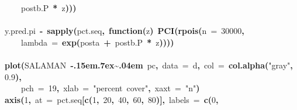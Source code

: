 \documentclass{article}
\makeatletter
\newcommand{\hlnumber}[1]{\textcolor[rgb]{0,0,0}{#1}}%
\newcommand{\hlfunctioncall}[1]{\textcolor[rgb]{.5,0,.33}{\textbf{#1}}}%
\newcommand{\hlstring}[1]{\textcolor[rgb]{.6,.6,1}{#1}}%
\newcommand{\hlkeyword}[1]{\textbf{#1}}%
\newcommand{\hlargument}[1]{\textcolor[rgb]{.69,.25,.02}{#1}}%
\newcommand{\hlformalargs}[1]{\hlargument{#1}}%
\newcommand{\hlassignement}[1]{\textbf{#1}}%
\newcommand{\hlsymbol}[1]{#1}%
\def\urltilda{\kern -.15em\lower .7ex\hbox{\~{}}\kern .04em}%
\newcommand{\hlstd}[1]{\textcolor[rgb]{0,0,0}{#1}}%
\newenvironment{kframe}{%
 \def\FrameCommand##1{\hskip\@totalleftmargin \hskip-\fboxsep
 \colorbox{shadecolor}{##1}\hskip-\fboxsep
     \hskip-\linewidth \hskip-\@totalleftmargin \hskip\columnwidth}%
 \MakeFramed {\advance\hsize-\width
   \@totalleftmargin\z@ \linewidth\hsize
   \@setminipage}}%
 {\par\unskip\endMakeFramed}
\newenvironment{knitrout}{}{} %
\makeatother
\begin{document}
\begin{knitrout}
{\begin{kframe}
\begin{flushleft}
\hlstd{}{\ }{\ }{\ }{\ }\hlsymbol{post}\hlkeyword{\usebox{\hlnormalsizeboxdollar}}\hlsymbol{b.P}{\ }\hlkeyword{*}{\ }\hlsymbol{z}\hlkeyword{)}\hlkeyword{)}\hlkeyword{)}\hspace*{\fill}\\
\hlstd{}\hspace*{\fill}\\
\hlstd{}\hlsymbol{y.pred.pi}{\ }\hlassignement{\usebox{\hlnormalsizeboxlessthan}-}{\ }\hlfunctioncall{sapply}\hlkeyword{(}\hlsymbol{pct.seq}\hlkeyword{,}{\ }\hlkeyword{function}\hlkeyword{(}\hlformalargs{z}\hlkeyword{)}{\ }\hlfunctioncall{PCI}\hlkeyword{(}\hlfunctioncall{rpois}\hlkeyword{(}\hlargument{n}{\ }\hlargument{=}{\ }\hlnumber{30000}\hlkeyword{,}\hspace*{\fill}\\
\hlstd{}{\ }{\ }{\ }{\ }\hlargument{lambda}{\ }\hlargument{=}{\ }\hlfunctioncall{exp}\hlkeyword{(}\hlsymbol{post}\hlkeyword{\usebox{\hlnormalsizeboxdollar}}\hlsymbol{a}{\ }\hlkeyword{+}{\ }\hlsymbol{post}\hlkeyword{\usebox{\hlnormalsizeboxdollar}}\hlsymbol{b.P}{\ }\hlkeyword{*}{\ }\hlsymbol{z}\hlkeyword{)}\hlkeyword{)}\hlkeyword{)}\hlkeyword{)}\hspace*{\fill}\\
\hlstd{}\hspace*{\fill}\\
\hlstd{}\hlfunctioncall{plot}\hlkeyword{(}\hlsymbol{SALAMAN}{\ }\hlkeyword{\urltilda{}}{\ }\hlsymbol{pc}\hlkeyword{,}{\ }\hlargument{data}{\ }\hlargument{=}{\ }\hlsymbol{d}\hlkeyword{,}{\ }\hlargument{col}{\ }\hlargument{=}{\ }\hlfunctioncall{col.alpha}\hlkeyword{(}\hlstring{"gray"}\hlkeyword{,}{\ }\hlnumber{0.9}\hlkeyword{)}\hlkeyword{,}\hspace*{\fill}\\
\hlstd{}{\ }{\ }{\ }{\ }\hlargument{pch}{\ }\hlargument{=}{\ }\hlnumber{19}\hlkeyword{,}{\ }\hlargument{xlab}{\ }\hlargument{=}{\ }\hlstring{"percent{\ }cover"}\hlkeyword{,}{\ }\hlargument{xaxt}{\ }\hlargument{=}{\ }\hlstring{"n"}\hlkeyword{)}\hspace*{\fill}\\
\hlstd{}\hlfunctioncall{axis}\hlkeyword{(}\hlnumber{1}\hlkeyword{,}{\ }\hlargument{at}{\ }\hlargument{=}{\ }\hlsymbol{pct.seq}\hlkeyword{[}\hlfunctioncall{c}\hlkeyword{(}\hlnumber{1}\hlkeyword{,}{\ }\hlnumber{20}\hlkeyword{,}{\ }\hlnumber{40}\hlkeyword{,}{\ }\hlnumber{60}\hlkeyword{,}{\ }\hlnumber{80}\hlkeyword{)}\hlkeyword{]}\hlkeyword{,}{\ }\hlargument{labels}{\ }\hlargument{=}{\ }\hlfunctioncall{c}\hlkeyword{(}\hlnumber{0}\hlkeyword{,}\hspace*{\fill}\\

\end{flushleft}
\end{kframe}}
\end{knitrout}
\end{document}
